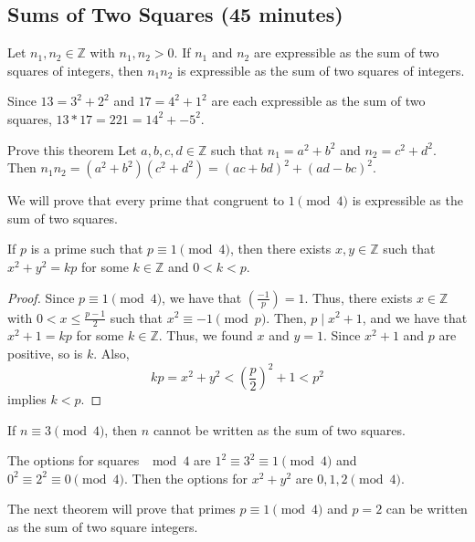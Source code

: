 \documentclass[letterpaper, 11 pt]{article}
\begin{document}
\subsection{Sums of Two Squares (45 minutes)}
\begin{thm}[Lemma 10.1]
 Let $n_1,n_2\in\mathbb{Z}$ with $n_1,n_2>0$. If $n_1$ and $n_2$ are expressible as the sum of two squares of integers, then $n_1n_2$ is expressible as the sum of two squares of integers.
\end{thm}
\begin{example}
 Since $13=3^2+{2}^2$ and $17={4}^2+{1}^2$ are each expressible as the sum of two squares, $13*17=221={14}^2+{-5}^2$.
\end{example}
\begin{br}[5 minutes]
Prove this theorem Let $a,b,c,d\in\mathbb{Z}$ such that $n_1=a^2+b^2$ and $n_2=c^2+d^2$. Then $n_1n_2=(a^2+b^2)(c^2+d^2)=(ac+bd)^2+(ad-bc)^2$.
\end{br}

We will prove that every prime that congruent to $1 \pmod 4$ is expressible as the sum of two squares.

\begin{thm}
 If $p$ is a prime such that $p\equiv 1 \pmod 4$, then there exists $x,y\in\mathbb{Z}$ such that $x^2+y^2=kp$ for some $k\in\mathbb{Z}$ and $0<k<p$.
\end{thm}
\begin{proof}
 Since $p\equiv 1 \pmod 4$, we have that $\left(\frac{-1}{p}\right)=1$. Thus, there exists $x\in\mathbb{Z}$ with $0<x\leq\frac{p-1}{2}$ such that $x^2\equiv -1 \pmod p$. Then, $p\mid x^2+1$, and we have that $x^2+1=kp$ for some $k\in\mathbb{Z}$. Thus, we found $x$ and $y=1$. Since $x^2+1$ and $p$ are positive, so is $k$. Also, \[kp=x^2+y^2<\left(\frac{p}{2}\right)^2+1<p^2\] implies $k<p$.
\end{proof}

\begin{br}[5 minutes]
 If $n\equiv 3 \pmod 4$, then $n$ cannot be written as the sum of two squares.
\end{br}
\begin{solution}
 The options for squares $\mod 4$ are $1^2\equiv 3^2\equiv 1 \pmod 4$ and $0^2\equiv 2^2\equiv 0 \pmod 4$. Then the options for $x^2+y^2$ are $0,1,2\pmod 4$.
\end{solution}

The next theorem will prove that primes $p\equiv 1 \pmod 4$ and $p=2$ can be written as the sum of two square integers.
\end{document}
